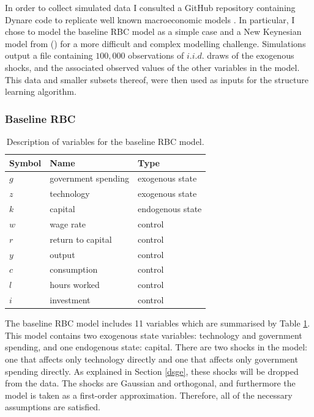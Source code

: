 \documentclass{article}
\begin{document}
In order to collect simulated data I consulted a GitHub repository containing Dynare code to replicate well known macroeconomic models \parencite{pfeifer2020}. In particular, I chose to model the baseline RBC model as a simple case and a New Keynesian model from \citeauthor{gali2015monetary} (\citeyear{gali2015monetary}) for a more difficult and complex modelling challenge. Simulations output a file containing $100,000$ observations of $i.i.d.$ draws of the exogenous shocks, and the associated observed values of the other variables in the model. This data and smaller subsets thereof, were then used as inputs for the structure learning algorithm.

\subsubsection{Baseline RBC}

\begin{table}
  \centering
  \begin{tabular}{|l|l|l|}
    \hline
    Symbol & Name & Type \\
    \hline
    $g$ & government spending & exogenous state \\
    $z$ & technology & exogenous state \\
    $k$ & capital & endogenous state \\
    $w$ & wage rate & control \\
    $r$ & return to capital & control \\
    $y$ & output & control \\
    $c$ & consumption & control \\
    $l$ & hours worked & control \\
    $i$ & investment & control \\ \cline{2-2}
    \hline
  \end{tabular}
  \caption{Description of variables for the baseline RBC model.}
  \label{rbc_data}
\end{table}

The baseline RBC model includes 11 variables which are summarised by Table \ref{rbc_data}. This model contains two exogenous state variables: technology and government spending, and one endogenous state: capital. There are two shocks in the model: one that affects only technology directly and one that affects only government spending directly. As explained in Section \ref{dsge}, these shocks will be dropped from the data. The shocks are Gaussian and orthogonal, and furthermore the model is taken as a first-order approximation. Therefore, all of the necessary assumptions are satisfied.
\end{document}
